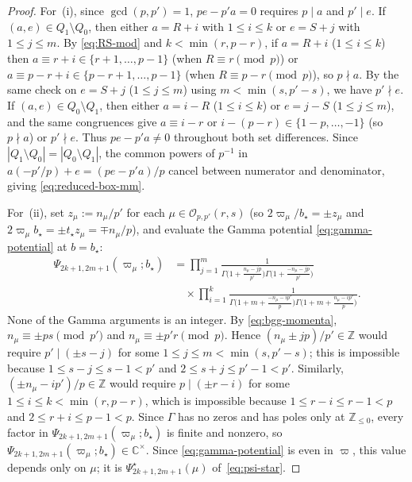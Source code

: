 \documentclass[twoside,10pt]{article}
\numberwithin{equation}{section}
\theoremstyle{slbody}
\theoremstyle{definition}
\theoremstyle{remark}
\begin{document}
\begin{proof}
For~(i), since \(\gcd(p,p')=1\), \(pe-p'a=0\) requires \(p\mid a\) and
\(p'\mid e\).  If \((a,e)\in Q_1\setminus Q_0\), then either
\(a=R+i\) with \(1\leq i\leq k\) or \(e=S+j\) with \(1\leq j\leq m\).
By \eqref{eq:RS-mod} and \(k<\min(r,p-r)\), if \(a=R+i\) (\(1\leq i\leq k\))
then \(a\equiv r+i\in\{r+1,\ldots,p-1\}\) (when \(R\equiv r\pmod p\)) or
\(a\equiv p-r+i\in\{p-r+1,\ldots,p-1\}\) (when \(R\equiv p-r\pmod p\)), so
\(p\nmid a\).  By the same check on \(e=S+j\) (\(1\leq j\leq m\)) using
\(m<\min(s,p'-s)\), we have \(p'\nmid e\).  If
\((a,e)\in Q_0\setminus Q_1\), then either \(a=i-R\) (\(1\leq i\leq k\)) or
\(e=j-S\) (\(1\leq j\leq m\)), and the same congruences give
\(a\equiv i-r\) or \(i-(p-r)\in\{1-p,\ldots,-1\}\) (so \(p\nmid a\)) or
\(p'\nmid e\).  Thus \(pe-p'a\neq0\) throughout both set differences.  Since
\(|Q_1\setminus Q_0|=|Q_0\setminus Q_1|\), the common powers of \(p^{-1}\) in
\(a(-p'/p)+e=(pe-p'a)/p\) cancel between numerator and denominator, giving
\eqref{eq:reduced-box-mm}.

For~(ii), set \(z_\mu:=n_\mu/p'\) for each \(\mu\in\mathcal{O}_{p,p'}(r,s)\)
(so \(2\varpi_\mu/b_\star=\pm z_\mu\) and \(2\varpi_\mu b_\star=\pm t_\star z_\mu=\mp n_\mu/p\)),
and evaluate the Gamma potential \eqref{eq:gamma-potential} at
\(b=b_\star\):
\[
 \begin{aligned}
 \Psi_{2k+1,2m+1}(\varpi_\mu;b_\star)
 &=\prod_{j=1}^m\frac{1}{\Gamma\bigl(1+\tfrac{n_\mu-jp}{p'}\bigr)
                         \Gamma\bigl(1+\tfrac{-n_\mu-jp}{p'}\bigr)}\\
 &\quad\times\prod_{i=1}^k\frac{1}{\Gamma\bigl(1+m+\tfrac{-n_\mu-ip'}{p}\bigr)
                         \Gamma\bigl(1+m+\tfrac{n_\mu-ip'}{p}\bigr)}.
 \end{aligned}
\]
None of the Gamma arguments is an integer.  By \eqref{eq:bgg-momenta},
\(n_\mu\equiv\pm ps\pmod{p'}\) and \(n_\mu\equiv\pm p'r\pmod{p}\).  Hence
\((n_\mu\pm jp)/p'\in\mathbb{Z}\) would require \(p'\mid(\pm s-j)\) for some
\(1\leq j\leq m<\min(s,p'-s)\); this is impossible because
\(1\leq s-j\leq s-1<p'\) and \(2\leq s+j\leq p'-1<p'\).  Similarly,
\((\pm n_\mu-ip')/p\in\mathbb{Z}\) would require \(p\mid(\pm r-i)\) for some
\(1\leq i\leq k<\min(r,p-r)\), which is impossible because
\(1\leq r-i\leq r-1<p\) and \(2\leq r+i\leq p-1<p\).  Since \(\Gamma\) has no
zeros and has poles only at \(\mathbb{Z}_{\leq0}\), every factor in
\(\Psi_{2k+1,2m+1}(\varpi_\mu;b_\star)\) is finite and nonzero, so
\(\Psi_{2k+1,2m+1}(\varpi_\mu;b_\star)\in\mathbb{C}^\times\).  Since
\eqref{eq:gamma-potential} is even in \(\varpi\), this value depends only on
\(\mu\); it is \(\Psi^\star_{2k+1,2m+1}(\mu)\) of~\eqref{eq:psi-star}.


\end{proof}
\end{document}
